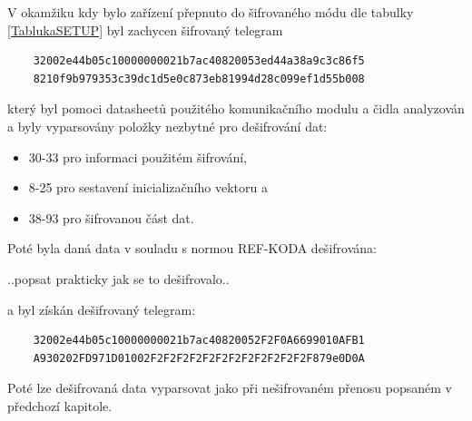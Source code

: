 V okamžiku kdy bylo zařízení přepnuto do šifrovaného módu dle tabulky \ref{TablukaSETUP} byl zachycen šifrovaný telegram

\begin{verbatim}
	32002e44b05c10000000021b7ac40820053ed44a38a9c3c86f5
	8210f9b979353c39dc1d5e0c873eb81994d28c099ef1d55b008
\end{verbatim}

který byl pomoci datasheetů použitého komunikačního modulu \cite{iqrfmodul} a čidla \cite{WeptechCidlo} analyzován a byly vyparsovány položky nezbytné pro dešifrování dat:
\begin{itemize}
	\item 30-33 pro informaci použitém šifrování,
	\item 8-25 pro sestavení inicializačního vektoru a
	\item 38-93 pro šifrovanou část dat.
\end{itemize}

Poté byla daná data v souladu s normou \colorbox[rgb]{0,1,0}{REF-KODA} dešifrována:


..\colorbox[rgb]{0,1,0}{popsat prakticky jak se to dešifrovalo}..


 a byl získán dešifrovaný telegram:

\begin{verbatim}
	32002e44b05c10000000021b7ac40820052F2F0A6699010AFB1
	A930202FD971D01002F2F2F2F2F2F2F2F2F2F2F2F2F879e0D0A
\end{verbatim}

Poté lze dešifrovaná data vyparsovat jako při nešifrovaném přenosu popsaném v předchozí kapitole.

